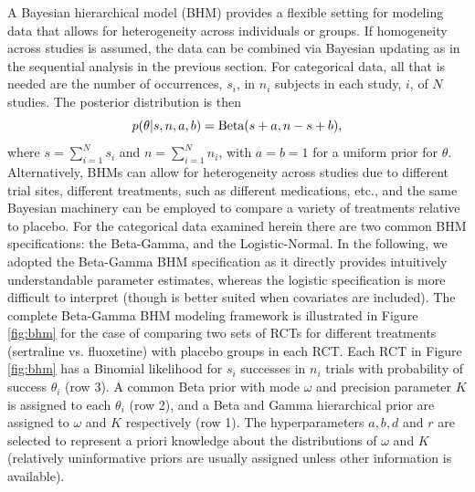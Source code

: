 \documentclass{juliacon}
\begin{document}
{A Bayesian hierarchical model (BHM) provides a flexible setting for modeling data that allows for heterogeneity across individuals or groups. If homogeneity across studies is assumed, the data can be combined via Bayesian updating as in the sequential analysis in the previous section.  For categorical data, all that is needed are the number of occurrences, $s_i$, in $n_i$ subjects in each study, $i$, of $N$ studies. The posterior distribution is then 
\begin{equation}
p(\theta | s, n,a,b) = \\ \textnormal{Beta}( s + a, n - s + b),
\label{eq:pbeta}
\end{equation}
where $s = \sum_{i=1}^N s_i$ and $n = \sum_{i=1}^N n_i$, with $a=b=1$ for a uniform prior for $\theta$.
\vskip 6pt
Alternatively, BHMs can allow for heterogeneity across studies due to different trial sites, different treatments, such as different medications, etc., and the same Bayesian machinery can be employed to compare a variety of treatments relative to placebo. For the categorical data examined herein there are two common BHM specifications: the Beta-Gamma\cite{Kruschke2014}, and the Logistic-Normal\cite{Mcelreath2015}.  In the following, we adopted the Beta-Gamma BHM specification as it directly provides intuitively understandable parameter estimates, whereas the logistic specification is more difficult to interpret (though is better suited when covariates are included).
\vskip 6pt
The complete Beta-Gamma BHM modeling framework is illustrated in Figure \ref{fig:bhm} for the case of comparing two sets of RCTs for different treatments (sertraline vs. fluoxetine) with placebo groups in each RCT. Each RCT in Figure \ref{fig:bhm} has a Binomial likelihood for $s_i$ successes in $n_i$ trials with probability of success $\theta_i$ (row 3).  A common Beta prior with mode $\omega$ and precision parameter $K$ is assigned to each $\theta_i$ (row 2), and a Beta and Gamma hierarchical prior are assigned to $\omega$ and $K$ respectively (row 1). The hyperparameters $a,b,d$ and $r$ are selected to represent a priori knowledge about the distributions of $\omega$ and $K$ (relatively uninformative priors are usually assigned unless other information is available).
}
\end{document}
